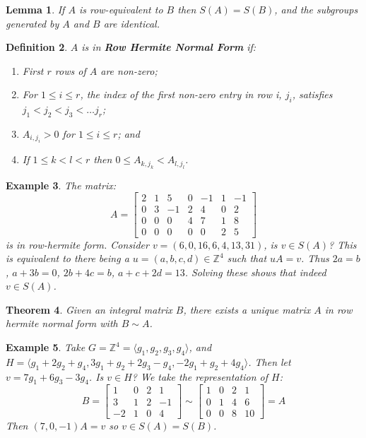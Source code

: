 \documentclass[a4paper,10pt]{article}
\newcommand{\ZZ}{\mathbb{Z}}
\newtheorem{thm}{Theorem}
\newtheorem{Def}[thm]{Definition}
\newtheorem{eg}[thm]{Example}
\newtheorem{Lem}[thm]{Lemma}
\begin{document}
\begin{Lem}
If $A$ is row-equivalent to $B$ then $S(A) = S(B)$, and the subgroups generated by $A$ and $B$ are identical.
\end{Lem}

\begin{Def}
$A$ is in \textbf{Row Hermite Normal Form} if:
\begin{enumerate}
\item First $r$ rows of $A$ are non-zero;
\item For $1 \leq i \leq r$, the index of the first non-zero entry in row i, $j_i$, satisfies $j_1 < j_2 < j_3 < \dots j_r$;
\item $A_{i, j_i} > 0$ for $1 \leq i \leq r$; and
\item If $1 \leq k < l < r$ then $0 \leq A_{k,j_k} < A_{l,j_l}$.
\end{enumerate}
\end{Def}

\begin{eg}
The matrix:
\[ A = \begin{bmatrix} 2 & 1 & 5 & 0 & -1 & 1 & -1 \\
                       0 & 3 & -1 & 2 & 4 & 0 & 2 \\
                       0 & 0 & 0 & 4 & 7 & 1 & 8 \\
                       0 & 0 & 0 & 0 & 0 & 2 & 5 
 \end{bmatrix} \]
is in row-hermite form. Consider $v = (6,0,16,6,4,13,31)$, is $v \in S(A)$? This is equivalent to there being a $u = (a,b,c,d) \in \ZZ^4$ such that $uA = v$. Thus $2a = b$, $a + 3b = 0$, $2b + 4c = b$, $a + c + 2d = 13$. Solving these shows that indeed $v \in S(A)$.
\end{eg}

\begin{thm}
Given an integral matrix $B$, there exists a unique matrix $A$ in row hermite normal form with $B \sim A$. 
\end{thm}

\begin{eg}
Take $G = \ZZ^4 = \langle g_1, g_2, g_3, g_4 \rangle$, and $H = \langle g_1 + 2g_2 + g_4, 3g_1 + g_2 + 2g_3 - g_4, -2g_1 + g_2 + 4g_4 \rangle$. Then let $v = 7g_1 + 6g_3 - 3g_4$. Is $v \in H$? We take the representation of $H$:
\[ B = \begin{bmatrix} 1 & 0 & 2 & 1 \\ 3 & 1 & 2 & -1 \\ -2 & 1 & 0 & 4 \end{bmatrix} \sim \begin{bmatrix} 1 & 0 & 2 & 1 \\ 0 & 1 & 4 & 6 \\ 0 & 0 & 8 & 10 \end{bmatrix} = A\]
Then $(7, 0, -1) A = v$ so $v \in S(A) = S(B)$. 
\end{eg}
\end{document}
